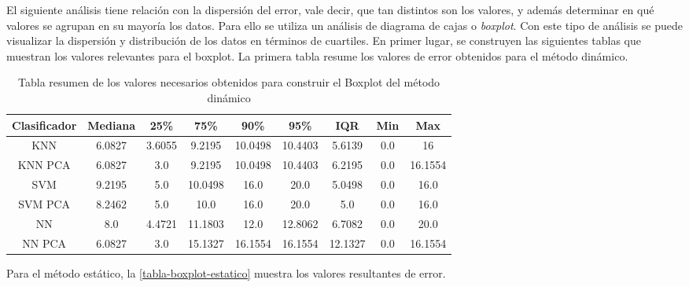 El siguiente análisis tiene relación con la dispersión del error, vale decir, que tan distintos son los valores, y además determinar en qué valores se agrupan en su mayoría los datos. Para ello se utiliza un análisis de diagrama de cajas o \textit{boxplot}. Con este tipo de análisis se puede visualizar la dispersión y distribución de los datos en términos de cuartiles. En primer lugar, se construyen las siguientes tablas que muestran los valores relevantes para el boxplot. La primera tabla resume los valores de error obtenidos para el método dinámico.

\begin{table}[!ht]
\centering
\caption[Tabla Boxplot método dinámico]{Tabla resumen de los valores necesarios obtenidos para construir el Boxplot del método dinámico}
\label{tabla-boxplot-dinamico}
\begin{tabular}{|c|c|c|c|c|c|c|c|c|}
\hline
\textbf{Clasificador} & \textbf{Mediana} & \textbf{25\%} & \textbf{75\%} & \textbf{90\%} & \textbf{95\%} & \textbf{IQR} & \textbf{Min} & \textbf{Max} \\ \hline
KNN                   & 6.0827           & 3.6055        & 9.2195        & 10.0498       & 10.4403       & 5.6139       & 0.0            & 16           \\ \hline
KNN PCA               & 6.0827           & 3.0           & 9.2195        & 10.0498       & 10.4403       & 6.2195       & 0.0          & 16.1554      \\ \hline
SVM                   & 9.2195           & 5.0           & 10.0498       & 16.0          & 20.0          & 5.0498       & 0.0          & 16.0         \\ \hline
SVM PCA               & 8.2462           & 5.0           & 10.0          & 16.0          & 20.0          & 5.0          & 0.0          & 16.0         \\ \hline
NN                    & 8.0              & 4.4721        & 11.1803       & 12.0          & 12.8062       & 6.7082       & 0.0          & 20.0         \\ \hline
NN PCA                & 6.0827           & 3.0           & 15.1327       & 16.1554       & 16.1554       & 12.1327      & 0.0          & 16.1554      \\ \hline
\end{tabular}
\end{table}


Para el método estático, la \autoref{tabla-boxplot-estatico} muestra los valores resultantes de error.

